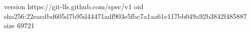 version https://git-lfs.github.com/spec/v1
oid sha256:22eacdbd605d7b95d44471adf903e5fbc7a1aa61e117bb049a92b3842f485887
size 69721
